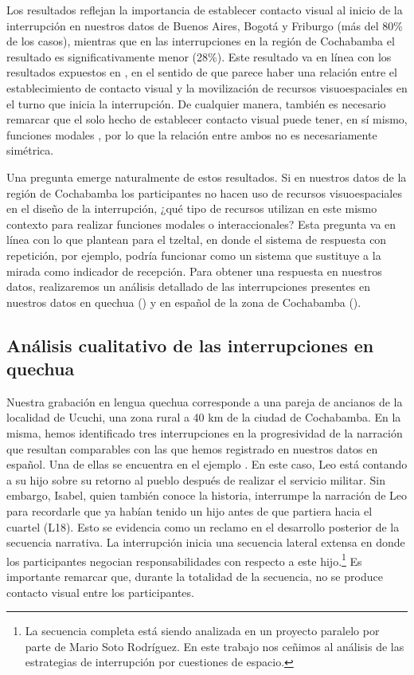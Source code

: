 \documentclass[output=paper]{../langscibook}
\begin{document}
Los resultados reflejan la importancia de establecer contacto visual al inicio de la interrupción en nuestros datos de Buenos Aires, Bogotá y Friburgo (más del 80\% de los casos), mientras que en las interrupciones en la región de Cochabamba el resultado es significativamente menor (28\%). Este resultado va en línea con los resultados expuestos en , en el sentido de que parece haber una relación entre el establecimiento de contacto visual y la movilización de recursos visuoespaciales en el turno que inicia la interrupción.  De cualquier manera, también es necesario remarcar que el solo hecho de establecer contacto visual puede tener, en sí mismo, funciones modales \citep{Kendon1967}, por lo que la relación entre ambos no es necesariamente simétrica.

Una pregunta emerge naturalmente de estos resultados. Si en nuestros datos de la región de Cochabamba los participantes no hacen uso de recursos visuoespaciales en el diseño de la interrupción, ¿qué tipo de recursos utilizan en este mismo contexto para realizar funciones modales o interaccionales? Esta pregunta va en línea con lo que plantean \citet[239-240]{RossanoEtAl2009} para el tzeltal, en donde el sistema de respuesta con repetición, por ejemplo, podría funcionar como un sistema que sustituye a la mirada como indicador de recepción. Para obtener una respuesta en nuestros datos, realizaremos un análisis detallado de las interrupciones presentes en nuestros datos en quechua () y en español de la zona de Cochabamba ().

\subsection{Análisis cualitativo de las interrupciones en quechua}\label{sec:satti:3.4}

Nuestra grabación en lengua quechua corresponde a una pareja de ancianos de la localidad de Ucuchi, una zona rural a 40 km de la ciudad de Cochabamba. En la misma, hemos identificado tres interrupciones en la progresividad de la narración que resultan comparables con las que hemos registrado en nuestros datos en español. Una de ellas se encuentra en el ejemplo . En este caso, Leo está contando a su hijo sobre su retorno al pueblo después de realizar el servicio militar.  Sin embargo, Isabel, quien también conoce la historia, interrumpe la narración de Leo para recordarle que ya habían tenido un hijo antes de que partiera hacia el cuartel (L18). Esto se evidencia como un reclamo en el desarrollo posterior de la secuencia narrativa. La interrupción inicia una secuencia lateral extensa en donde los participantes negocian responsabilidades con respecto a este hijo.\footnote{La secuencia completa está siendo analizada en un proyecto paralelo por parte de Mario Soto Rodríguez. En este trabajo nos ceñimos al análisis de las estrategias de interrupción por cuestiones de espacio.}  Es importante remarcar que, durante la totalidad de la secuencia, no se produce contacto visual entre los participantes.
\end{document}
